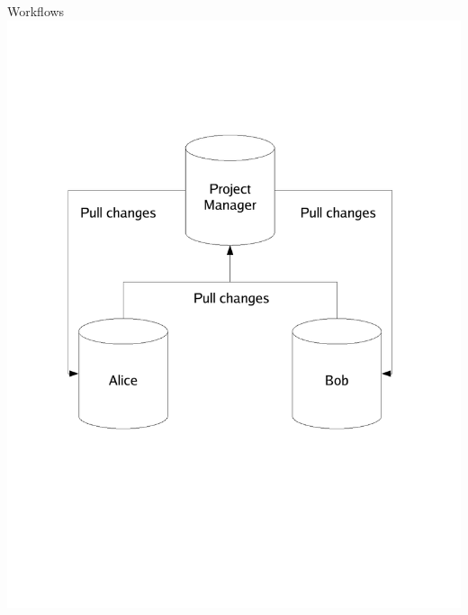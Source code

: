 \documentclass[final,hyperref={pdfpagelabels=false},notitlepage=true]{beamer}
\begin{document}
\begin{frame}{}
\begin{columns}[t]
\begin{column}{0.45\linewidth}
\begin{block}{\large Workflows}
          \includegraphics[scale=1.90]{images/collaborativeDevelopmentWithMaintainer.pdf}
        \end{block}


\end{column}
\end{columns}
\end{frame}
\end{document}
